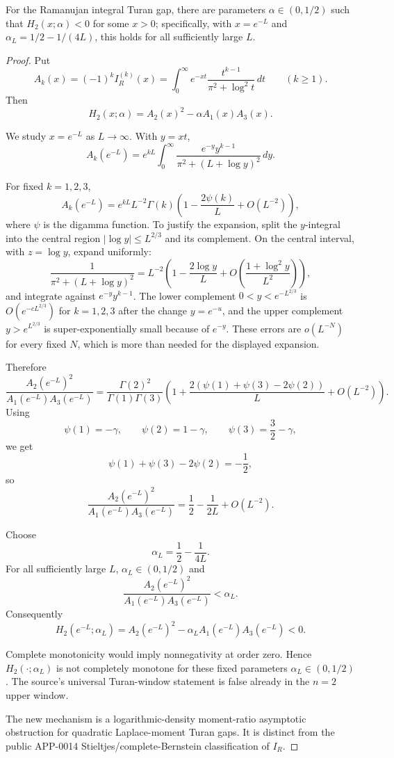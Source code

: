 \begin{proposition}
\label{res:ramanujan-turan-n2-upper-window-counterfamily}
For the Ramanujan integral Turan gap, there are parameters \(\alpha\in(0,1/2)\) such that \(H_2(x;\alpha)<0\) for some \(x>0\); specifically, with \(x=e^{-L}\) and \(\alpha_L=1/2-1/(4L)\), this holds for all sufficiently large \(L\).
\end{proposition}
\begin{proof}
Put
\[
A_k(x)=(-1)^k I_R^{(k)}(x)
=\int_0^\infty e^{-xt}\frac{t^{k-1}}{\pi^2+\log^2 t}\,dt
\qquad (k\ge1).
\]
Then
\[
H_2(x;\alpha)=A_2(x)^2-\alpha A_1(x)A_3(x).
\]

We study \(x=e^{-L}\) as \(L\to\infty\). With \(y=xt\),
\[
A_k(e^{-L})
=
e^{kL}\int_0^\infty
\frac{e^{-y}y^{k-1}}
{\pi^2+(L+\log y)^2}\,dy.
\]

For fixed \(k=1,2,3\),
\[
A_k(e^{-L})
=
e^{kL}L^{-2}\Gamma(k)
\left(1-\frac{2\psi(k)}{L}+O(L^{-2})\right),
\]
where \(\psi\) is the digamma function. To justify the expansion, split the \(y\)-integral into the central region \(|\log y|\le L^{2/3}\) and its complement. On the central interval, with \(z=\log y\), expand uniformly:
\[
\frac{1}{\pi^2+(L+\log y)^2}
=
L^{-2}\left(1-\frac{2\log y}{L}+O\left(\frac{1+\log^2 y}{L^2}\right)\right),
\]
and integrate against \(e^{-y}y^{k-1}\). The lower complement \(0<y<e^{-L^{2/3}}\) is \(O(e^{-cL^{2/3}})\) for \(k=1,2,3\) after the change \(y=e^{-u}\), and the upper complement \(y>e^{L^{2/3}}\) is super-exponentially small because of \(e^{-y}\). These errors are \(o(L^{-N})\) for every fixed \(N\), which is more than needed for the displayed expansion.

Therefore
\[
\frac{A_2(e^{-L})^2}{A_1(e^{-L})A_3(e^{-L})}
=
\frac{\Gamma(2)^2}{\Gamma(1)\Gamma(3)}
\left(
1+\frac{2(\psi(1)+\psi(3)-2\psi(2))}{L}+O(L^{-2})
\right).
\]
Using
\[
\psi(1)=-\gamma,\qquad
\psi(2)=1-\gamma,\qquad
\psi(3)=\frac32-\gamma,
\]
we get
\[
\psi(1)+\psi(3)-2\psi(2)=-\frac12,
\]
so
\[
\frac{A_2(e^{-L})^2}{A_1(e^{-L})A_3(e^{-L})}
=
\frac12-\frac{1}{2L}+O(L^{-2}).
\]

Choose
\[
\alpha_L=\frac12-\frac{1}{4L}.
\]
For all sufficiently large \(L\), \(\alpha_L\in(0,1/2)\) and
\[
\frac{A_2(e^{-L})^2}{A_1(e^{-L})A_3(e^{-L})}<\alpha_L.
\]
Consequently
\[
H_2(e^{-L};\alpha_L)
=
A_2(e^{-L})^2-\alpha_L A_1(e^{-L})A_3(e^{-L})
<0.
\]

Complete monotonicity would imply nonnegativity at order zero. Hence \(H_2(\cdot;\alpha_L)\) is not completely monotone for these fixed parameters \(\alpha_L\in(0,1/2)\). The source's universal Turan-window statement is false already in the \(n=2\) upper window.

The new mechanism is a logarithmic-density moment-ratio asymptotic obstruction for quadratic Laplace-moment Turan gaps. It is distinct from the public APP-0014 Stieltjes/complete-Bernstein classification of \(I_R\).
\end{proof}

